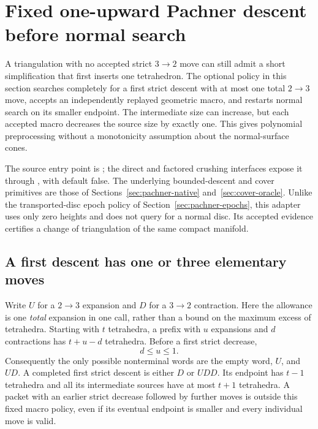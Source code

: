 \section{Fixed one-upward Pachner descent before normal search}
\label{sec:pachner-descent-crushing}

A triangulation with no accepted strict $3\to2$ move can still admit a
short simplification that first inserts one tetrahedron.  The optional
policy in this section searches completely for a first strict descent
with at most one total $2\to3$ move, accepts an independently replayed
geometric macro, and restarts normal search on its smaller endpoint.
The intermediate size can increase, but each accepted macro decreases
the source size by exactly one.  This gives polynomial preprocessing
without a monotonicity assumption about the normal-surface cones.

The source entry point is ; the direct
and factored crushing interfaces expose it through
, with default false.  The underlying
bounded-descent and cover primitives are those of
Sections~\ref{sec:pachner-native} and~\ref{sec:cover-oracle}.
Unlike the transported-disc epoch policy of
Section~\ref{sec:pachner-epochs}, this adapter uses only zero heights
and does not query for a normal disc.  Its accepted evidence certifies
a change of triangulation of the same compact manifold.

\subsection{A first descent has one or three elementary moves}

Write $U$ for a $2\to3$ expansion and $D$ for a $3\to2$ contraction.
Here the allowance is one \emph{total} expansion in one call, rather
than a bound on the maximum excess of tetrahedra.  Starting with $t$
tetrahedra, a prefix with $u$ expansions and $d$ contractions has
$t+u-d$ tetrahedra.  Before a first strict decrease,
\[
                         d\le u\le1.
\]
Consequently the only possible nonterminal words are the empty word,
$U$, and $UD$.  A completed first strict descent is either $D$ or $UDD$.
Its endpoint has $t-1$ tetrahedra and all its intermediate sources have
at most $t+1$ tetrahedra.  A packet with an earlier strict decrease
followed by further moves is outside this fixed macro policy, even if
its eventual endpoint is smaller and every individual move is valid.

